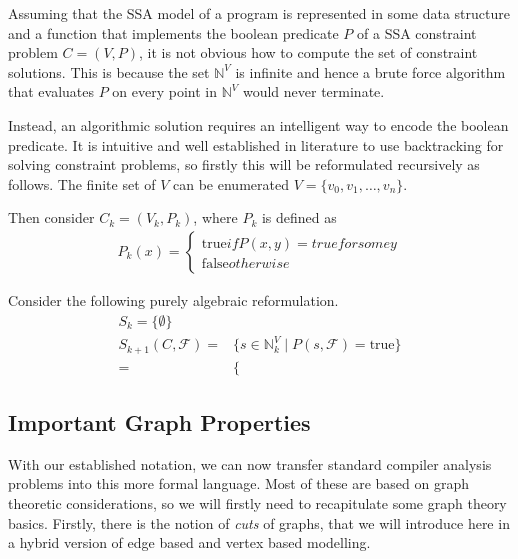     Assuming that the SSA model of a program is represented in some data
    structure and a function that implements the boolean predicate $P$ of a
    SSA constraint problem $C=(V,P)$, it is not obvious how to compute the set
    of constraint solutions.
    This is because the set $\mathbb N^V$ is infinite and hence a brute force
    algorithm that evaluates $P$ on every point in $\mathbb N^V$ would never
    terminate.

    Instead, an algorithmic solution requires an intelligent way to encode the
    boolean predicate.
    It is intuitive and well established in literature to use backtracking for
    solving constraint problems, so firstly this will be reformulated
    recursively as follows.
    The finite set of $V$ can be enumerated $V=\{v_0,v_1,\dots,v_n\}$.

    Then consider $C_k=(V_k,P_k)$, where $P_k$ is defined as
    \begin{align*}
        P_k(x)=\left\{\begin{array}{}\text{true} if P(x,y)=true for some y\\
                                     \text{false} otherwise\end{array}\right.
    \end{align*}

    Consider the following purely algebraic reformulation.
    \begin{align*}
        S_k=\{\emptyset\}\\
        S_{k+1}(C,\mathcal F)=&\{s\in\mathbb N^V_k\mid P(s,\mathcal F)=\text{true}\}\\
                             =&\{
    \end{align*}


\subsection{Important Graph Properties}

    With our established notation, we can now transfer standard compiler
    analysis problems into this more formal language.
    Most of these are based on graph theoretic considerations, so we
    will firstly need to recapitulate some graph theory basics.
    Firstly, there is the notion of {\em cuts} of graphs, that we will introduce
    here in a hybrid version of edge based and vertex based modelling.

